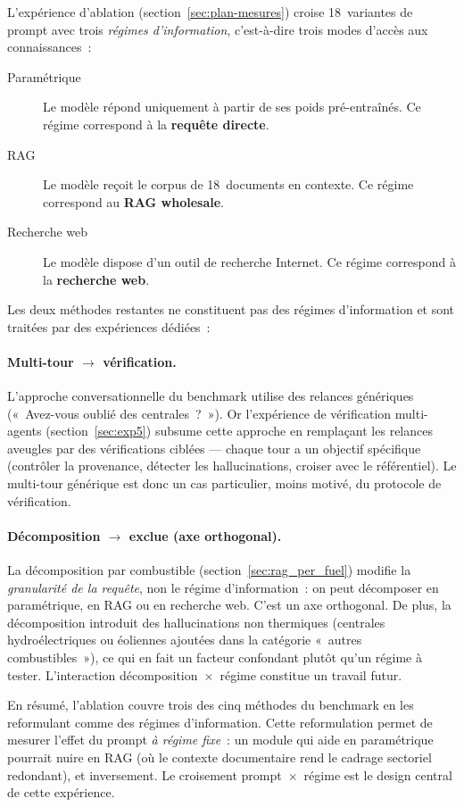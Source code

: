 L'expérience d'ablation (section~\ref{sec:plan-mesures}) croise 18~variantes
de prompt avec trois \emph{régimes d'information}, c'est-à-dire trois modes
d'accès aux connaissances~:

\begin{description}
\item[Paramétrique] Le modèle répond uniquement à partir de ses poids
  pré-entraînés. Ce régime correspond à la \textbf{requête directe}.
\item[RAG] Le modèle reçoit le corpus de 18~documents en contexte.
  Ce régime correspond au \textbf{RAG wholesale}.
\item[Recherche web] Le modèle dispose d'un outil de recherche Internet.
  Ce régime correspond à la \textbf{recherche web}.
\end{description}

\noindent Les deux méthodes restantes ne constituent pas des régimes
d'information et sont traitées par des expériences dédiées~:

\paragraph{Multi-tour $\to$ vérification.}
L'approche conversationnelle du benchmark utilise des relances génériques
(«~Avez-vous oublié des centrales~?~»). Or l'expérience de vérification
multi-agents (section~\ref{sec:exp5}) subsume cette approche en remplaçant
les relances aveugles par des vérifications ciblées --- chaque tour a un
objectif spécifique (contrôler la provenance, détecter les hallucinations,
croiser avec le référentiel). Le multi-tour générique est donc un cas
particulier, moins motivé, du protocole de vérification.

\paragraph{Décomposition $\to$ exclue (axe orthogonal).}
La décomposition par combustible (section~\ref{sec:rag_per_fuel}) modifie
la \emph{granularité de la requête}, non le régime d'information~: on peut
décomposer en paramétrique, en RAG ou en recherche web. C'est un axe
orthogonal. De plus, la décomposition introduit des hallucinations non
thermiques (centrales hydroélectriques ou éoliennes ajoutées dans la
catégorie «~autres combustibles~»), ce qui en fait un facteur confondant
plutôt qu'un régime à tester. L'interaction
décomposition~$\times$~régime constitue un travail futur.

\medskip
\noindent En résumé, l'ablation couvre trois des cinq méthodes du benchmark
en les reformulant comme des régimes d'information. Cette reformulation
permet de mesurer l'effet du prompt \emph{à régime fixe}~: un module qui
aide en paramétrique pourrait nuire en RAG (où le contexte documentaire
rend le cadrage sectoriel redondant), et inversement. Le croisement
prompt~$\times$~régime est le design central de cette expérience.

